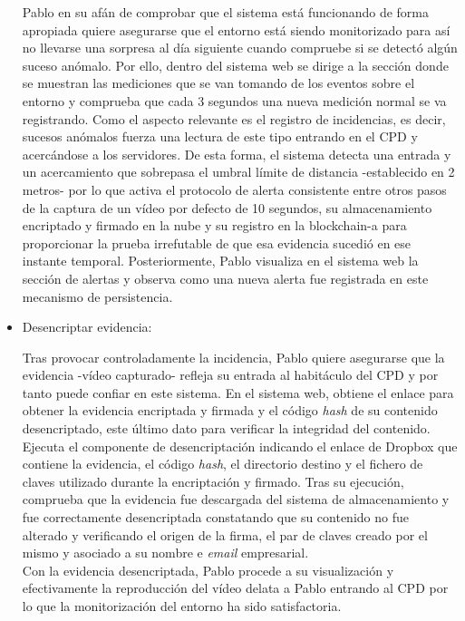 \documentclass[12pt,a4paper, twoside]{report}
\begin{document}
\begin{itemize}
		Pablo en su afán de comprobar que el sistema está funcionando de forma apropiada quiere asegurarse que el entorno está siendo monitorizado para así no llevarse una sorpresa al día siguiente cuando compruebe si se detectó algún suceso anómalo. Por ello, dentro del sistema web se dirige a la sección donde se muestran las mediciones que se van tomando de los eventos sobre el entorno y comprueba que cada 3 segundos una nueva medición normal se va registrando. Como el aspecto relevante es el registro de incidencias, es decir, sucesos anómalos fuerza una lectura de este tipo entrando en el CPD y acercándose a los servidores. De esta forma, el sistema detecta una entrada y un acercamiento que sobrepasa el umbral límite de distancia -establecido en 2 metros- por lo que activa el protocolo de alerta consistente entre otros pasos de la captura de un vídeo por defecto de 10 segundos, su almacenamiento encriptado y firmado en la nube y su registro en la \gls{blockchain-a} para proporcionar la prueba irrefutable de que esa evidencia sucedió en ese instante temporal. Posteriormente, Pablo visualiza en el sistema web la sección de alertas y observa como una nueva alerta fue registrada en este mecanismo de persistencia. 
		
		\item Desencriptar evidencia:

		Tras provocar controladamente la incidencia, Pablo quiere asegurarse que la evidencia -vídeo capturado- refleja su entrada al habitáculo del CPD y por tanto puede confiar en este sistema. En el sistema web, obtiene el enlace para obtener la evidencia encriptada y firmada y el código \textit{hash} de su contenido desencriptado, este último dato para verificar la integridad del contenido. Ejecuta el componente de desencriptación indicando el enlace de Dropbox que contiene la evidencia, el código \textit{hash}, el directorio destino y el fichero de claves utilizado durante la encriptación y firmado. Tras su ejecución, comprueba que la evidencia fue descargada del sistema de almacenamiento y fue correctamente desencriptada constatando que su contenido no fue alterado y verificando el origen de la firma, el par de claves creado por el mismo y asociado a su nombre e \textit{email} empresarial. \\
		
		Con la evidencia desencriptada, Pablo procede a su visualización y efectivamente la reproducción del vídeo delata a Pablo entrando al CPD por lo que la monitorización del entorno ha sido satisfactoria.
		

\end{itemize}
\end{document}
